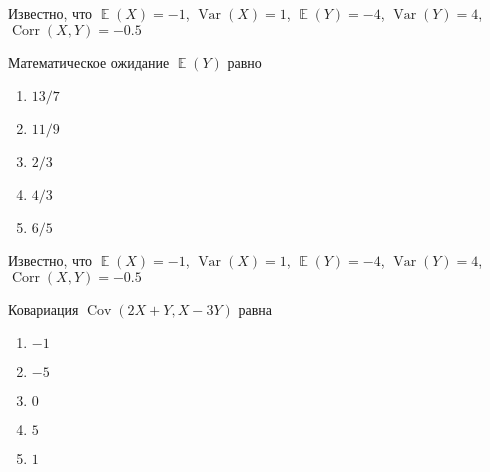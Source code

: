 \documentclass[t]{beamer}
\DeclareMathOperator{\Var}{Var}
\DeclareMathOperator{\Cov}{Cov}
\DeclareMathOperator{\Corr}{Corr}
\DeclareMathOperator{\E}{\mathbb{E}}
\begin{document}
 \begin{frame} \label{24} 
\begin{block}{24} 

Известно, что $\E(X)=-1$, $\Var(X)=1$, $\E(Y)=-4$, $\Var(Y)=4$, $\Corr(X,Y)=-0.5$

\vspace{0.5cm} 
 
Математическое ожидание $\E(Y)$ равно
 


 \end{block} 
\begin{enumerate} 
\item[] \hyperlink{24-No}{\beamergotobutton{} $13/7$
}
\item[] \hyperlink{24-Yes}{\beamergotobutton{} $11/9$}
\item[] \hyperlink{24-No}{\beamergotobutton{} $2/3$}
\item[] \hyperlink{24-No}{\beamergotobutton{} $4/3$}
\item[] \hyperlink{24-No}{\beamergotobutton{} $6/5$}
\end{enumerate} 
\end{frame} 


 \begin{frame} \label{25} 
\begin{block}{25} 

Известно, что $\E(X)=-1$, $\Var(X)=1$, $\E(Y)=-4$, $\Var(Y)=4$, $\Corr(X,Y)=-0.5$

\vspace{0.5cm} 
 
Ковариация $\Cov(2X+Y,X-3Y)$ равна
 


 \end{block} 
\begin{enumerate} 
\item[] \hyperlink{25-No}{\beamergotobutton{} $-1$
}
\item[] \hyperlink{25-Yes}{\beamergotobutton{} $-5$}
\item[] \hyperlink{25-No}{\beamergotobutton{} $0$}
\item[] \hyperlink{25-No}{\beamergotobutton{} $5$}
\item[] \hyperlink{25-No}{\beamergotobutton{} $1$}
\end{enumerate} 
\end{frame} 
\end{document}

